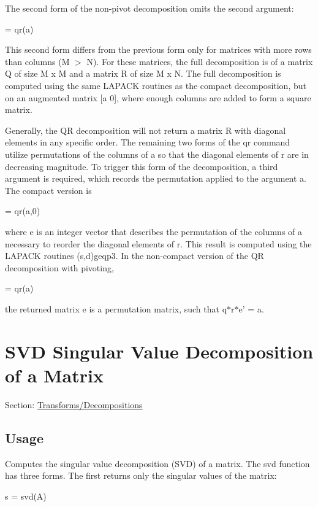 The second form of the non-\/pivot decomposition omits the second {} argument\-: \begin{DoxyVerb}  [q,r] = qr(a)
\end{DoxyVerb}
 This second form differs from the previous form only for matrices with more rows than columns ({\ttfamily M $>$ N}). For these matrices, the full decomposition is of a matrix {\ttfamily Q} of size {\ttfamily M x M} and a matrix {\ttfamily R} of size {\ttfamily M x N}. The full decomposition is computed using the same L\-A\-P\-A\-C\-K routines as the compact decomposition, but on an augmented matrix {\ttfamily \mbox{[}a 0\mbox{]}}, where enough columns are added to form a square matrix.

Generally, the Q\-R decomposition will not return a matrix {\ttfamily R} with diagonal elements in any specific order. The remaining two forms of the {\ttfamily qr} command utilize permutations of the columns of {\ttfamily a} so that the diagonal elements of {\ttfamily r} are in decreasing magnitude. To trigger this form of the decomposition, a third argument is required, which records the permutation applied to the argument {\ttfamily a}. The compact version is \begin{DoxyVerb}  [q,r,e] = qr(a,0)
\end{DoxyVerb}
 where {\ttfamily e} is an integer vector that describes the permutation of the columns of {\ttfamily a} necessary to reorder the diagonal elements of {\ttfamily r}. This result is computed using the L\-A\-P\-A\-C\-K routines {\ttfamily (s,d)geqp3}. In the non-\/compact version of the Q\-R decomposition with pivoting, \begin{DoxyVerb}  [q,r,e] = qr(a)
\end{DoxyVerb}
 the returned matrix {\ttfamily e} is a permutation matrix, such that {\ttfamily q$\ast$r$\ast$e' = a}. \hypertarget{transforms_svd}{}\section{S\-V\-D Singular Value Decomposition of a Matrix}\label{transforms_svd}
Section\-: \hyperlink{sec_transforms}{Transforms/\-Decompositions} \hypertarget{vtkwidgets_vtkxyplotwidget_Usage}{}\subsection{Usage}\label{vtkwidgets_vtkxyplotwidget_Usage}
Computes the singular value decomposition (S\-V\-D) of a matrix. The {\ttfamily svd} function has three forms. The first returns only the singular values of the matrix\-: \begin{DoxyVerb}  s = svd(A)
\end{DoxyVerb}

